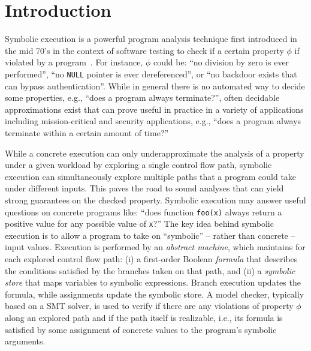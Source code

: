 
\section{Introduction}

Symbolic execution is a powerful program analysis technique first introduced in the mid 70's in the context of software testing to check if a certain property $\phi$ if violated by a program~\cite{K-CACM76,H-TSE77}. For instance, $\phi$ could be: ``no division by zero is ever performed'', ``no {\tt NULL} pointer is ever dereferenced'', or ``no backdoor exists that can bypass authentication''. While in general there is no automated way to decide some properties, e.g., ``does a program always terminate?'', often decidable approximations exist that can prove useful in practice in a variety of applications including mission-critical and security applications, e.g., ``does a program always terminate within a certain amount of time?''

While a concrete execution can only underapproximate the analysis of a property under a given workload by exploring a single control flow path, symbolic execution can simultaneously explore multiple paths that a program could take under different inputs. This paves the road to sound analyses that can yield strong guarantees on the checked property. Symbolic execution may answer useful questions on concrete programs like: ``does function {\tt foo(x)} always return a positive value for any possible value of {\tt x}?'' The key idea behind symbolic execution is to allow a program to take on ``symbolic'' -- rather than concrete -- input values. Execution is performed by an {\em abstract machine}, which maintains for each explored control flow path: (i) a first-order Boolean {\em formula} that describes the conditions satisfied by the branches taken on that path, and (ii) a {\em symbolic store} that maps variables to symbolic expressions. Branch execution updates the formula, while assignments update the symbolic store. A model checker, typically based on a SMT solver, is used to verify if there are any violations of property $\phi$ along an explored path and if the path itself is realizable, i.e., its formula is satisfied by some assignment of concrete values to the program's symbolic arguments.


